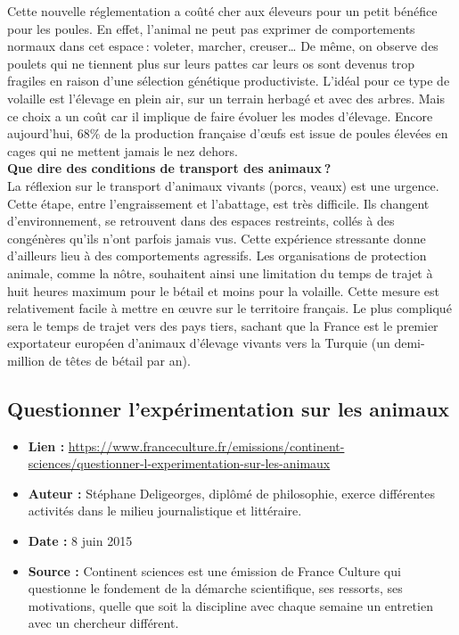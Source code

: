 \documentclass[10pt]{article}
\begin{document}
Cette nouvelle réglementation a coûté cher aux éleveurs pour un petit bénéfice pour les poules. En effet, l’animal ne peut pas exprimer de comportements normaux dans cet espace : voleter, marcher, creuser… De même, on observe des poulets qui ne tiennent plus sur leurs pattes car leurs os sont devenus trop fragiles en raison d’une sélection génétique productiviste. L’idéal pour ce type de volaille est l’élevage en plein air, sur un terrain herbagé et avec des arbres. Mais ce choix a un coût car il implique de faire évoluer les modes d’élevage. Encore aujourd’hui, 68\% de la production française d’œufs est issue de poules élevées en cages qui ne mettent jamais le nez dehors.\\

\textbf{Que dire des conditions de transport des animaux ?}\\

La réflexion sur le transport d’animaux vivants (porcs, veaux) est une urgence. Cette étape, entre l’engraissement et l’abattage, est très difficile. Ils changent d’environnement, se retrouvent dans des espaces restreints, collés à des congénères qu’ils n’ont parfois jamais vus. Cette expérience stressante donne d’ailleurs lieu à des comportements agressifs. Les organisations de protection animale, comme la nôtre, souhaitent ainsi une limitation du temps de trajet à huit heures maximum pour le bétail et moins pour la volaille. Cette mesure est relativement facile à mettre en œuvre sur le territoire français. Le plus compliqué sera le temps de trajet vers des pays tiers, sachant que la France est le premier exportateur européen d’animaux d’élevage vivants vers la Turquie (un demi-million de têtes de bétail par an).\\

\newpage
\subsection{Questionner l’expérimentation sur les animaux}
\begin{itemize}
	\item \textbf{Lien : }  \url{https://www.franceculture.fr/emissions/continent-sciences/questionner-l-experimentation-sur-les-animaux} 
	\item \textbf{Auteur : }  Stéphane Deligeorges, diplômé de philosophie, exerce différentes activités dans le milieu journalistique et littéraire.
	\item \textbf{Date : }  8 juin 2015
	\item \textbf{Source : }  Continent sciences est une émission de France Culture qui questionne le fondement de la démarche scientifique, ses ressorts, ses motivations, quelle que soit la discipline avec chaque semaine un entretien avec un chercheur différent.
\end{itemize}
\end{document}
